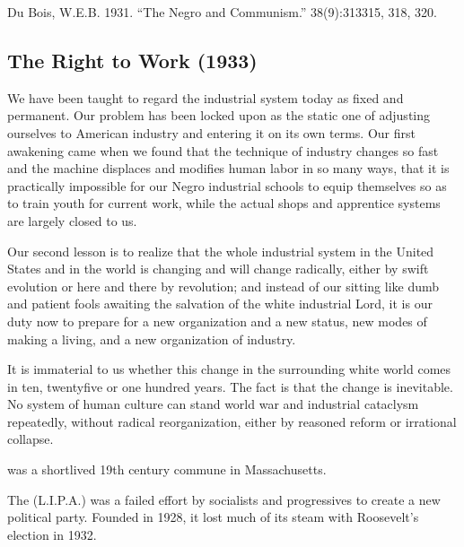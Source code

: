 \documentclass[letterpaper,10pt,english]{jupyterBook}
\begin{document}
\sphinxAtStartPar
{} Du Bois, W.E.B. 1931. “The Negro and Communism.”  38(9):313\sphinxhyphen{}315, 318, 320.


\subsection{The Right to Work (1933)}
\label{\detokenize{Volumes/40/04/right_to_work:the-right-to-work-1933}}\label{\detokenize{Volumes/40/04/right_to_work::doc}}
\sphinxAtStartPar
We have been taught to regard the industrial system today as fixed and permanent. Our problem has been locked upon as the static one of adjusting ourselves to American industry and entering it on its own terms. Our first awakening came when we found that the technique of industry changes so fast and the machine displaces and modifies human labor in so many ways, that it is practically impossible for our Negro industrial schools to equip themselves so as to train youth for current work, while the actual shops and apprentice systems are largely closed to us.

\sphinxAtStartPar
Our second lesson is to realize that the whole industrial system in the United States and in the world is changing and will change radically, either by swift evolution or here and there by revolution; and instead of our sitting like dumb and patient fools awaiting the salvation of the white industrial Lord, it is our duty now to prepare for a new organization and a new status, new modes of making a living, and a new organization of industry.

\sphinxAtStartPar
It is immaterial to us whether this change in the surrounding white world comes in ten, twenty\sphinxhyphen{}five or one hundred years. The fact is that the change is inevitable. No system of human culture can stand world war and industrial cataclysm repeatedly, without radical reorganization, either by reasoned reform or irrational collapse.



\begin{sphinxShadowBox}
\sphinxstylesidebartitle{}

\sphinxAtStartPar
{} was a short\sphinxhyphen{}lived 19th century commune in Massachusetts.

\sphinxAtStartPar
The  (L.I.P.A.) was a failed effort by socialists and progressives to create a new political party. Founded in 1928, it lost much of its steam with Roosevelt’s election in 1932.
\end{sphinxShadowBox}
\end{document}
